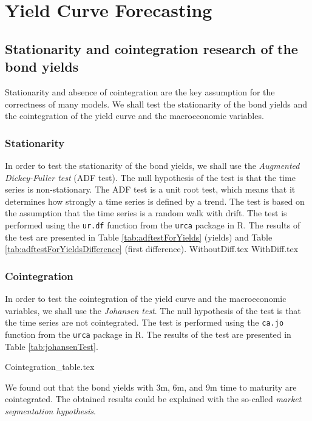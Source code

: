 \section{Yield Curve Forecasting}
    \subsection{Stationarity and cointegration research of the bond yields}
        Stationarity and absence of cointegration are the key assumption for the correctness of many models.
        We shall test the stationarity of the bond yields and the cointegration of the yield curve and the macroeconomic variables.
        \subsubsection{Stationarity}
            In order to test the stationarity of the bond yields, we shall use the \emph{Augmented Dickey-Fuller test} (ADF test).
            The null hypothesis of the test is that the time series is non-stationary.
            The ADF test is a unit root test, which means that it determines how strongly a time series is defined by a trend.
            The test is based on the assumption that the time series is a random walk with drift.
            The test is performed using the \texttt{ur.df} function from the \texttt{urca} package in R.
            The results of the test are presented in Table \ref{tab:adftestForYields} (yields) and Table 
            \ref{tab:adftestForYieldsDifference} (first difference).
            {WithoutDiff.tex}
            {WithDiff.tex}



        \subsubsection{Cointegration}
            In order to test the cointegration of the yield curve and the macroeconomic variables, we shall use the
            \emph{Johansen test}. The null hypothesis of the test is that the time series are not cointegrated.
            The test is performed using the \texttt{ca.jo} function from the \texttt{urca} package in R.
            The results of the test are presented in Table \ref{tab:johansenTest}.    

            {Cointegration_table.tex}

            We found out that the bond yields with 3m, 6m, and 9m time to maturity are cointegrated. The obtained results could 
            be explained with the so-called \emph{market segmentation hypothesis}. 
            
